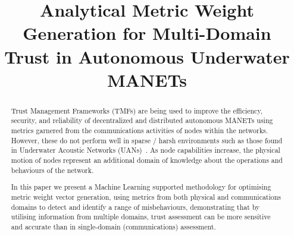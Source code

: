 \documentclass[conference]{IEEEtran}
\begin{document}
\IEEEoverridecommandlockouts
\IEEEpubidadjcol

\title{Analytical Metric Weight Generation for Multi-Domain Trust in Autonomous Underwater MANETs}


\author{
}%

\maketitle

\begin{abstract}

Trust Management Frameworks (TMFs) are being used to improve the efficiency, security, and reliability of decentralized and distributed autonomous MANETs using metrics garnered from the communications activities of nodes within the networks.
However, these do not perform well in sparse / harsh environments such as those found in Underwater Acoustic Networks (UANs)~\cite{Bolster2015}.
As node capabilities increase, the physical motion of nodes represent an additional domain of knowledge about the operations and behaviours of the network.

In this paper we present a Machine Learning supported methodology for optimising metric weight vector generation, using metrics from both physical and communications domains to detect and identify a range of misbehaviours, demonstrating that by utilising information from multiple domains, trust assessment can be more sensitive and accurate than in single-domain (communications) assessment.
\end{abstract}

%
\IEEEpeerreviewmaketitle
\end{document}

